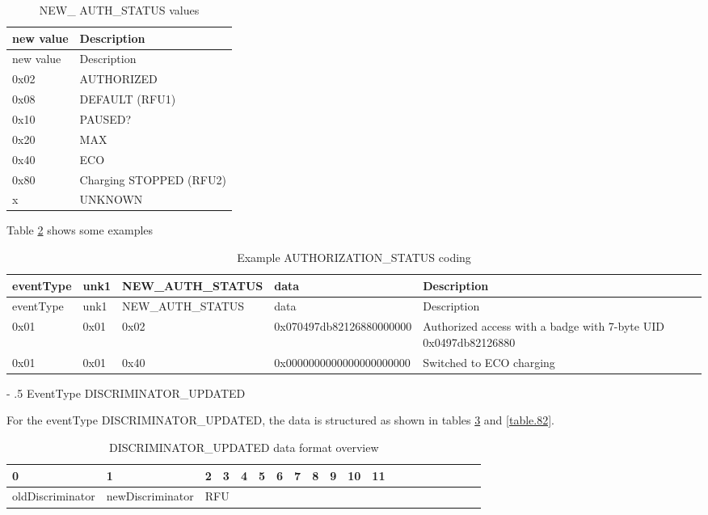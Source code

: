 \documentclass[a4paper]{article}
\makeatletter
\renewcommand\subparagraph{%
   \@startsection{subparagraph}{5}{0mm}%
      {-\baselineskip}%
      {.5\baselineskip}%
      {\normalfont\normalsize\itshape}}
\makeatother
\begin{document}
\begin{longtable}[]{@{}ll@{}}
	\caption{NEW\_ AUTH\_STATUS values}
	\label{table.81}
	\tabularnewline
	\toprule\noalign{}
	new value & Description    \\
	\midrule\noalign{}
	\endfirsthead
	\toprule\noalign{}
	new value & Description    \\
	\midrule\noalign{}
	\endhead
	\bottomrule\noalign{}
	\endlastfoot
        0x02  & AUTHORIZED \\
	0x08  &  DEFAULT (RFU1) \\
	0x10  &  PAUSED? \\
	0x20  & MAX \\
	0x40  & ECO \\
	0x80  & Charging STOPPED (RFU2)\\
           x & UNKNOWN\\
\end{longtable}

Table \ref{table.88} shows some examples

\begin{longtable}[]{llllp{5cm}}
	\caption{Example AUTHORIZATION\_STATUS coding}
	\label{table.88}
	\tabularnewline
	\toprule\noalign{}
	eventType & unk1 & NEW\_AUTH\_STATUS & data                                  & Description      \\
	\midrule\noalign{}
	\endfirsthead
	\toprule\noalign{}
	eventType & unk1 &  NEW\_AUTH\_STATUS & data                                  & Description      \\
	\midrule\noalign{}
	\endhead
	\bottomrule\noalign{}
	\endlastfoot
	0x01 & 0x01 & 0x02 & \footnotesize 0x070497db82126880000000 &              
	Authorized access with a badge with 7-byte UID 0x0497db82126880 \\
	0x01 & 0x01 & 0x40 & \footnotesize 0x0000000000000000000000 & Switched to ECO charging \\
\end{longtable}

\subparagraph{EventType DISCRIMINATOR\_UPDATED}
\label{eventType_DISCRIMINATOR_UPDATED}

For the eventType DISCRIMINATOR\_UPDATED, the data is structured as shown in tables \ref{table.95} and \ref{table.82}.

\begin{longtable}{|l|l|l|l|l|l|l|l|l|l|l|l|l|l|l|l|l|l|l|l|}
	\caption{DISCRIMINATOR\_UPDATED data format overview}
	\label{table.95}\\  %
	\hline
	0 & 1 & 2 & 3 & 4 & 5 & 6 & 7 & 8 & 9 & 10 & 11 \\
	\hline
	oldDiscriminator & newDiscriminator &
	\multicolumn{10}{|l|}{RFU} \\
	\hline
\end{longtable}
\end{document}
